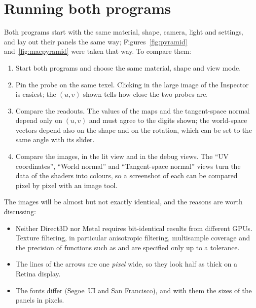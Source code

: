 \section{Running both programs}
Both programs start with the same material, shape, camera, light and settings, and lay out their
panels the same way; Figures~\ref{fig:pyramid} and~\ref{fig:macpyramid} were taken that way. To
compare them:
\begin{enumerate}
\item Start both programs and choose the same material, shape and view mode.
\item Pin the probe on the same texel. Clicking in the large image of the Inspector is easiest;
the $(u,v)$ shown tells how close the two probes are.
\item Compare the readouts. The values of the maps and the tangent-space normal depend only on
$(u,v)$ and must agree to the digits shown; the world-space vectors depend also on the shape and
on the rotation, which can be set to the same angle with its slider.
\item Compare the images, in the lit view and in the debug views. The ``UV coordinates'',
``World normal'' and ``Tangent-space normal'' views turn the data of the shaders into colours,
so a screenshot of each can be compared pixel by pixel with an image tool.
\end{enumerate}
The images will be almost but not exactly identical, and the reasons are worth discussing:
\begin{itemize}
\item Neither Direct3D nor Metal requires bit-identical results from different GPUs. Texture
filtering, in particular anisotropic filtering, multisample coverage and the precision of
functions such as  and  are specified only up to a tolerance.
\item The lines of the arrows are one \emph{pixel} wide, so they look half as thick on a Retina
display.
\item The fonts differ (Segoe~UI and San Francisco), and with them the sizes of the panels in
pixels.
\end{itemize}

